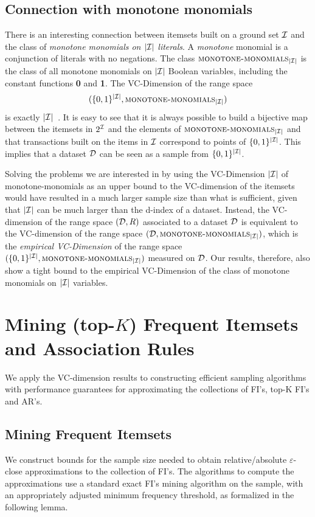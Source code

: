 \subsection{Connection with monotone monomials}
There is an interesting connection between itemsets built on a ground set
${\cal I}$ and 
the class of \emph{monotone monomials on $|{\cal I}|$ literals}. 
A \emph{monotone} monomial is a conjunction of literals with no negations. The
class $\textsc{monotone-monomials}_{|{\cal I}|}$ is the class of
all monotone monomials on $|{\cal I}|$ Boolean variables, including the constant functions
{\bf 0} and {\bf 1}. The VC-Dimension of the range space
\[
(\{0,1\}^{|{\cal I}|},\textsc{monotone-monomials}_{|{\cal I}|})\]
is exactly $|{\cal I}|$~\cite[Coroll.~3]{NatschlagerS96}. It is easy to see that it is always
possible to build a bijective map between the itemsets in $2^{\cal I}$ and the
elements of $\textsc{monotone-monomials}_{|{\cal I}|}$ and that transactions built
on the items in ${\cal I}$ correspond to points of $\{0,1\}^{|{\cal I}|}$. This implies
that a dataset ${\cal D}$ can be seen as a sample from $\{0,1\}^{|{\cal I}|}$.

Solving the problems we are interested in by using the VC-Dimension $|{\cal I}|$ of
monotone-monomials as an upper bound to the VC-dimension of the itemsets would
have resulted in a much larger sample size than what is sufficient, given that
$|{\cal I}|$ can be much larger than the d-index of a dataset. Instead, the
VC-dimension of the range space $({\cal D},R)$ associated to a dataset ${\cal D}$ is
equivalent to the VC-dimension of the range space
$({\cal D},\textsc{monotone-monomials}_{|{\cal I}|})$, which is the \emph{empirical
VC-Dimension} of the range space
$(\{0,1\}^{|{\cal I}|},\textsc{monotone-monomials}_{|{\cal I}|})$ measured on ${\cal D}$. Our
results, therefore, also show a tight bound to the empirical VC-Dimension of the
class of monotone monomials on $|{\cal I}|$ variables. 

  
\section{Mining (top-$K$) Frequent Itemsets and Association Rules}\label{sec:approx}
We apply the VC-dimension results to constructing efficient sampling algorithms
with performance guarantees for approximating the collections of FI's, top-K FI's and AR's.

\subsection{Mining Frequent Itemsets}\label{sec:absapproxfi}
We construct bounds for the sample size needed to obtain
relative/absolute $\varepsilon$-close approximations to the collection of FI's. The
algorithms to compute the approximations use a standard
exact FI's mining algorithm on the sample, with an appropriately adjusted minimum
frequency threshold, as formalized in the following lemma.

